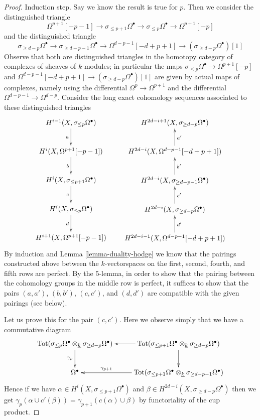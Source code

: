 \begin{proof}
\medskip\noindent
Induction step. Say we know the result is true for $p$. Then
we consider the distinguished triangle
$$
\Omega^{p + 1}[-p - 1] \to
\sigma_{\leq p + 1}\Omega^\bullet \to
\sigma_{\leq p}\Omega^\bullet \to
\Omega^{p + 1}[-p]
$$
and the distinguished triangle
$$
\sigma_{\geq d - p}\Omega^\bullet \to
\sigma_{\geq d - p - 1}\Omega^\bullet \to
\Omega^{d - p - 1}[-d + p + 1] \to
(\sigma_{\geq d - p}\Omega^\bullet)[1]
$$
Observe that both are distinguished triangles in the homotopy category
of complexes of sheaves of $\underline{k}$-modules; in particular the
maps $\sigma_{\leq p}\Omega^\bullet \to \Omega^{p + 1}[-p]$ and
$\Omega^{d - p - 1}[-d + p + 1] \to (\sigma_{\geq d - p}\Omega^\bullet)[1]$
are given by actual maps of complexes, namely using the differential
$\Omega^p \to \Omega^{p + 1}$ and the differential
$\Omega^{d - p - 1} \to \Omega^{d - p}$.
Consider the long exact cohomology sequences associated to these
distinguished triangles
$$
\xymatrix{
H^{i - 1}(X, \sigma_{\leq p}\Omega^\bullet) \ar[d]_a \\
H^i(X, \Omega^{p + 1}[-p - 1]) \ar[d]_b \\
H^i(X, \sigma_{\leq p + 1}\Omega^\bullet) \ar[d]_c \\
H^i(X, \sigma_{\leq p}\Omega^\bullet) \ar[d]_d \\
H^{i + 1}(X, \Omega^{p + 1}[-p - 1])
}
\quad\quad
\xymatrix{
H^{2d - i  + 1}(X, \sigma_{\geq d - p}\Omega^\bullet) \\
H^{2d - i}(X, \Omega^{d - p - 1}[-d + p + 1]) \ar[u]_{a'} \\
H^{2d - i}(X, \sigma_{\geq d - p - 1}\Omega^\bullet) \ar[u]_{b'} \\
H^{2d - i}(X, \sigma_{\geq d - p}\Omega^\bullet) \ar[u]_{c'} \\
H^{2d - i - 1}(X, \Omega^{d - p - 1}[-d + p + 1]) \ar[u]_{d'}
}
$$
By induction and Lemma \ref{lemma-duality-hodge}
we know that the pairings constructed above between the
$k$-vectorspaces on the first, second, fourth, and fifth
rows are perfect. By the $5$-lemma, in order to show that
the pairing between the cohomology groups in the middle row
is perfect, it suffices to show that the pairs
$(a, a')$, $(b, b')$, $(c, c')$, and $(d, d')$
are compatible with the given pairings (see below).

\medskip\noindent
Let us prove this for the pair $(c, c')$. Here we observe simply
that we have a commutative diagram
$$
\xymatrix{
\text{Tot}(\sigma_{\leq p} \Omega^\bullet \otimes_{\underline{k}}
\sigma_{\geq d - p} \Omega^\bullet) \ar[d]_{\gamma_p} &
\text{Tot}(\sigma_{\leq p + 1} \Omega^\bullet \otimes_{\underline{k}}
\sigma_{\geq d - p} \Omega^\bullet) \ar[l] \ar[d] \\
\Omega^\bullet &
\text{Tot}(\sigma_{\leq p + 1} \Omega^\bullet \otimes_{\underline{k}}
\sigma_{\geq d - p - 1} \Omega^\bullet) \ar[l]_-{\gamma_{p + 1}}
}
$$
Hence if we have $\alpha \in H^i(X, \sigma_{\leq p + 1}\Omega^\bullet)$
and $\beta \in H^{2d - i}(X, \sigma_{\geq d - p}\Omega^\bullet)$
then we get
$\gamma_p(\alpha \cup c'(\beta)) = \gamma_{p + 1}(c(\alpha) \cup \beta)$
by functoriality of the cup product.


\end{proof}
